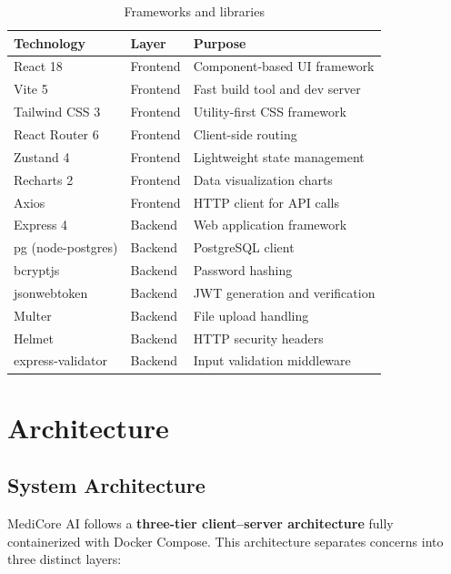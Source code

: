\documentclass[12pt,a4paper,oneside]{report}
\begin{document}
\begin{table}[H]
\centering
\caption{Frameworks and libraries}
\label{tab:frameworks}
\begin{tabular}{|p{3cm}|p{3cm}|p{7cm}|}
\hline
\textbf{Technology} & \textbf{Layer} & \textbf{Purpose} \\
\hline
React 18 & Frontend & Component-based UI framework \\
\hline
Vite 5 & Frontend & Fast build tool and dev server \\
\hline
Tailwind CSS 3 & Frontend & Utility-first CSS framework \\
\hline
React Router 6 & Frontend & Client-side routing \\
\hline
Zustand 4 & Frontend & Lightweight state management \\
\hline
Recharts 2 & Frontend & Data visualization charts \\
\hline
Axios & Frontend & HTTP client for API calls \\
\hline
Express 4 & Backend & Web application framework \\
\hline
pg (node-postgres) & Backend & PostgreSQL client \\
\hline
bcryptjs & Backend & Password hashing \\
\hline
jsonwebtoken & Backend & JWT generation and verification \\
\hline
Multer & Backend & File upload handling \\
\hline
Helmet & Backend & HTTP security headers \\
\hline
express-validator & Backend & Input validation middleware \\
\hline
\end{tabular}
\end{table}

\section{Architecture}

\subsection{System Architecture}

MediCore AI follows a \textbf{three-tier client--server architecture} fully containerized with Docker Compose. This architecture separates concerns into three distinct layers:
\end{document}
